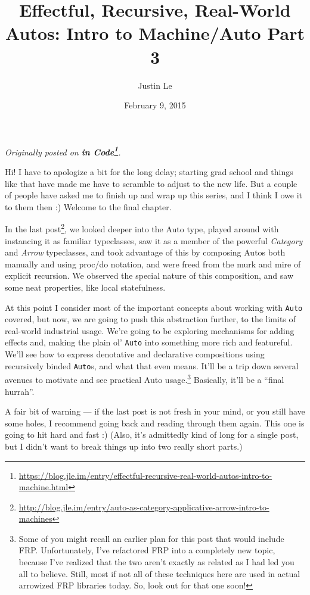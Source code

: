 \documentclass[]{article}
\title{Effectful, Recursive, Real-World Autos: Intro to Machine/Auto Part 3}
\author{Justin Le}
\date{February 9, 2015}
\renewcommand{\href}[2]{#2\footnote{\url{#1}}}
\begin{document}
\maketitle

\emph{Originally posted on
\textbf{\href{https://blog.jle.im/entry/effectful-recursive-real-world-autos-intro-to-machine.html}{in
Code}}.}

Hi! I have to apologize a bit for the long delay; starting grad school
and things like that have made me have to scramble to adjust to the new
life. But a couple of people have asked me to finish up and wrap up this
series, and I think I owe it to them then :) Welcome to the final
chapter.

In the
\href{http://blog.jle.im/entry/auto-as-category-applicative-arrow-intro-to-machines}{last
post}, we looked deeper into the Auto type, played around with
instancing it as familiar typeclasses, saw it as a member of the
powerful \emph{Category} and \emph{Arrow} typeclasses, and took
advantage of this by composing Autos both manually and using proc/do
notation, and were freed from the murk and mire of explicit recursion.
We observed the special nature of this composition, and saw some neat
properties, like local statefulness.

At this point I consider most of the important concepts about working
with \texttt{Auto} covered, but now, we are going to push this
abstraction further, to the limits of real-world industrial usage. We're
going to be exploring mechanisms for adding effects and, making the
plain ol' \texttt{Auto} into something more rich and featureful. We'll
see how to express denotative and declarative compositions using
recursively binded \texttt{Auto}s, and what that even means. It'll be a
trip down several avenues to motivate and see practical Auto
usage.\footnote{Some of you might recall an earlier plan for this post
  that would include FRP. Unfortunately, I've refactored FRP into a
  completely new topic, because I've realized that the two aren't
  exactly as related as I had led you all to believe. Still, most if not
  all of these techniques here are used in actual arrowized FRP
  libraries today. So, look out for that one soon!} Basically, it'll be
a ``final hurrah''.

A fair bit of warning --- if the last post is not fresh in your mind, or
you still have some holes, I recommend going back and reading through
them again. This one is going to hit hard and fast :) (Also, it's
admittedly kind of long for a single post, but I didn't want to break
things up into two really short parts.)
\end{document}
